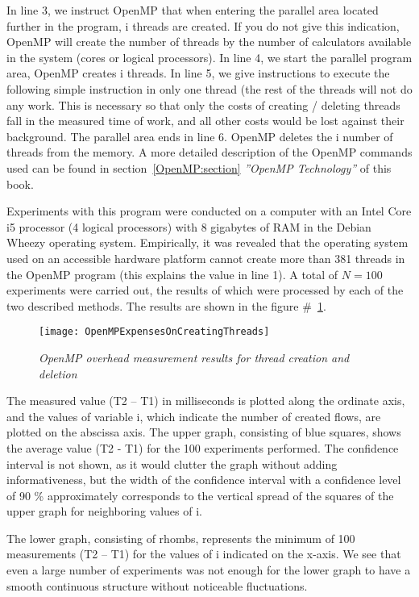 {	\begin{figure}[H]
		
	\end{figure}
	In line 3, we instruct OpenMP that when entering the parallel area located further in the program, i threads are created. If you do not give this indication, OpenMP will create the number of threads by the number of calculators available in the system (cores or logical processors). In line 4, we start the parallel program area, OpenMP creates i threads. In line 5, we give instructions to execute the following simple instruction in only one thread (the rest of the threads will not do any work. This is necessary so that only the costs of creating / deleting threads fall in the measured time of work, and all other costs would be lost against their background. The parallel area ends in line 6. OpenMP deletes the i number of  threads from the memory. A more detailed description of the OpenMP commands used can be found in section~\ref{OpenMP:section} \textit{''OpenMP Technology''} of this book.
	\par Experiments with this program were conducted on a computer with an Intel Core i5 processor (4 logical processors) with 8 gigabytes of RAM in the Debian Wheezy operating system. Empirically, it was revealed that the operating system used on an accessible hardware platform cannot create more than 381 threads in the OpenMP program (this explains the value in line 1). A total of $N = 100$ experiments were carried out, the results of which were processed by each of the two described methods. The results are shown in the figure \#~\ref{OpenMPExpensesOnCreatingThreads:image}.
	\begin{figure}[H]
		\texttt{[image: OpenMPExpensesOnCreatingThreads]}
		\caption{\textit{OpenMP overhead measurement results for thread creation and deletion}}
		\label{OpenMPExpensesOnCreatingThreads:image}
	\end{figure} 
	\par The measured value (T2 – T1) in milliseconds is plotted along the ordinate axis, and the values of variable i, which indicate the number of created flows, are plotted on the abscissa axis. The upper graph, consisting of blue squares, shows the average value (T2 - T1) for the 100 experiments performed. The confidence interval is not shown, as it would clutter the graph without adding informativeness, but the width of the confidence interval with a confidence level of 90 \% approximately corresponds to the vertical spread of the squares of the upper graph for neighboring values of i.
	\par The lower graph, consisting of rhombs, represents the minimum of 100 measurements (T2 – T1) for the values of i indicated on the x-axis. We see that even a large number of experiments was not enough for the lower graph to have a smooth continuous structure without noticeable fluctuations.

}